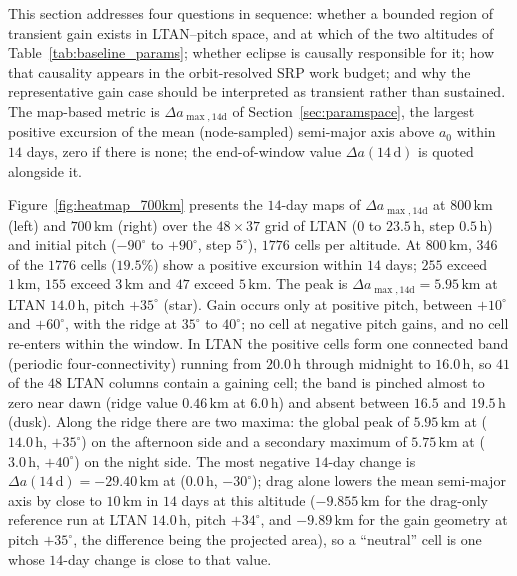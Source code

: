 \FloatBarrier
\noindent This section addresses four questions in sequence: whether a bounded region of transient gain exists in LTAN--pitch space, and at which of the two altitudes of Table~\ref{tab:baseline_params}; whether eclipse is causally responsible for it; how that causality appears in the orbit-resolved SRP work budget; and why the representative gain case should be interpreted as transient rather than sustained. The map-based metric is \(\Delta a_{\max,14\mathrm{d}}\) of Section~\ref{sec:paramspace}, the largest positive excursion of the mean (node-sampled) semi-major axis above \(a_0\) within \(14\) days, zero if there is none; the end-of-window value \(\Delta a(14\,\mathrm{d})\) is quoted alongside it.

\vspace{5pt}
\par\noindent Figure~\ref{fig:heatmap_700km} presents the \(14\)-day maps of \(\Delta a_{\max,14\mathrm{d}}\) at \(800\,\mathrm{km}\) (left) and \(700\,\mathrm{km}\) (right) over the \(48\times37\) grid of LTAN (\(0\) to \(23.5\,\mathrm{h}\), step \(0.5\,\mathrm{h}\)) and initial pitch (\(-90^\circ\) to \(+90^\circ\), step \(5^\circ\)), \(1776\) cells per altitude. At \(800\,\mathrm{km}\), \(346\) of the \(1776\) cells (\(19.5\%\)) show a positive excursion within \(14\) days; \(255\) exceed \(1\,\mathrm{km}\), \(155\) exceed \(3\,\mathrm{km}\) and \(47\) exceed \(5\,\mathrm{km}\). The peak is \(\Delta a_{\max,14\mathrm{d}} = 5.95\,\mathrm{km}\) at LTAN \(14.0\,\mathrm{h}\), pitch \(+35^\circ\) (star). Gain occurs only at positive pitch, between \(+10^\circ\) and \(+60^\circ\), with the ridge at \(35^\circ\) to \(40^\circ\); no cell at negative pitch gains, and no cell re-enters within the window. In LTAN the positive cells form one connected band (periodic four-connectivity) running from \(20.0\,\mathrm{h}\) through midnight to \(16.0\,\mathrm{h}\), so \(41\) of the \(48\) LTAN columns contain a gaining cell; the band is pinched almost to zero near dawn (ridge value \(0.46\,\mathrm{km}\) at \(6.0\,\mathrm{h}\)) and absent between \(16.5\) and \(19.5\,\mathrm{h}\) (dusk). Along the ridge there are two maxima: the global peak of \(5.95\,\mathrm{km}\) at (\(14.0\,\mathrm{h}\), \(+35^\circ\)) on the afternoon side and a secondary maximum of \(5.75\,\mathrm{km}\) at (\(3.0\,\mathrm{h}\), \(+40^\circ\)) on the night side. The most negative \(14\)-day change is \(\Delta a(14\,\mathrm{d}) = -29.40\,\mathrm{km}\) at (\(0.0\,\mathrm{h}\), \(-30^\circ\)); drag alone lowers the mean semi-major axis by close to \(10\,\mathrm{km}\) in \(14\) days at this altitude (\(-9.855\,\mathrm{km}\) for the drag-only reference run at LTAN \(14.0\,\mathrm{h}\), pitch \(+34^\circ\), and \(-9.89\,\mathrm{km}\) for the gain geometry at pitch \(+35^\circ\), the difference being the projected area), so a ``neutral'' cell is one whose \(14\)-day change is close to that value.

